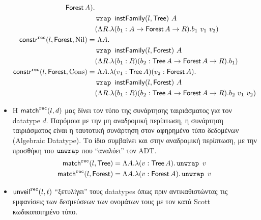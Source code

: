 \begin{itemize}
\begin{align*}
        \Forest A) .\\ &\wrap\ \dtInstFinal{l}{\Tree}\ A\\ &(\Lambda R .
        \lambda (b_1 : A \rightarrow \Forest A \rightarrow R) . b_1\ v_1\
        v_2)\\ \constrRec{l}{\Forest}{\NNil} =&\ \Lambda A . \\ &\wrap\
        \dtInstFinal{l}{\Forest}\ A\\ &(\Lambda R . \lambda (b_1 : R) (b_2 :
        \Tree A \rightarrow \Forest A \rightarrow R) . b_1)\\
        \constrRec{l}{\Forest}{\CCons} =&\ \Lambda A . \lambda (v_1 : \Tree A)
        (v_2 : \Forest A) . \\ &\wrap\ \dtInstFinal{l}{\Forest}\ A\\ &(\Lambda
        R . \lambda (b_1 : R) (b_2 : \Tree A \rightarrow \Forest A \rightarrow
        R) . b_2\ v_1\ v_2) \end{align*} \item Η $\mathsf{match}^{\operatorname{\texttt{rec}}}(l, d)$ μας δίνει
          τον τύπο της συνάρτησης ταιριάσματος για τον datatype $d$. Παρόμοια
          με την μη αναδρομική περίπτωση, η συνάρτηση ταιριάσματος είναι η
          ταυτοτική  συνάρτηση στον αφηρημένο τύπο δεδομένων (Algebraic
          Datatype). Το ίδιο συμβαίνει και στην αναδρομική περίπτωση, με την
          προσθήκη του  $\operatorname{\texttt{unwrap}}$ που ``αναλύει'' τον ADT.  \begin{align*}
            \mathsf{match}^{\operatorname{\texttt{rec}}}(l, \operatorname{\textsf{Tree}}) &= \Lambda A . \lambda (v : \operatorname{\textsf{Tree}} A) . \operatorname{\texttt{unwrap}}\
            v\\ \mathsf{match}^{\operatorname{\texttt{rec}}}(l, \operatorname{\textsf{Forest}}) &= \Lambda A . \lambda (v : \operatorname{\textsf{Forest}} A) .
            \operatorname{\texttt{unwrap}}\ v \end{align*} \item $\mathsf{unveil}^{\operatorname{\texttt{rec}}}(l, t)$ ``ξετυλίγει'' τους
              datatypes όπως πριν αντικαθιστώντας τις εμφανίσεις των δεσμεύσεων
              των ονομάτων τους με τον κατά Scott κωδικοποιημένο τύπο.
  \end{itemize}
